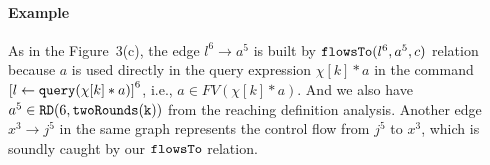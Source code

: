   \paragraph*{Example}
As in the Figure~3(c), 
the edge $l^6 \to a^5$ is built by $\mathtt{flowsTo}(l^6, a^5, c)$ relation because
$a$ is used directly in the query expression $\chi[k]*a$
in the command $\clabel{\assign{l}{\query(\chi[k]*a)}}^6$,
i.e., $a \in FV(\chi[k]*a)$.
And we also have $a^5 \in \mathtt{RD}(6, \mathtt{twoRounds(k)})$ from the reaching definition analysis.
Another edge $x^3 \to j^5$ in the same graph represents the control flow from $j^5$ to $x^3$, which is soundly caught by our $\mathtt{flowsTo}$ relation.